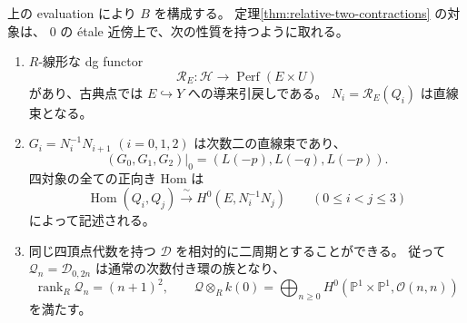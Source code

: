 \begin{proposition}\label{prop:relative-even-rollup}
上の evaluation により $B$ を構成する。
定理\ref{thm:relative-two-contractions} の対象は、
$0$ の \'etale 近傍上で、次の性質を持つように取れる。
\begin{enumerate}
\item
$R$-線形な dg functor
\[
 \mathcal R_E:\mathcal H\longrightarrow\operatorname{Perf}(E\times U)
\]
があり、古典点では $E\hookrightarrow Y$ への導来引戻しである。
$N_i=\mathcal R_E(Q_i)$ は直線束となる。
\item
$G_i=N_i^{-1}N_{i+1}$ $(i=0,1,2)$ は次数二の直線束であり、
\[
 (G_0,G_1,G_2)|_0=(L(-p),L(-q),L(-p)).
\]
四対象の全ての正向き Hom は
\[
 \operatorname{Hom}(Q_i,Q_j)
 \xrightarrow{\ \sim\ }H^0(E,N_i^{-1}N_j)
 \qquad(0\le i<j\le3)
 \label{eq:relative-restriction-hom}\tag{RB5}
\]
によって記述される。
\item
同じ四頂点代数を持つ $\mathcal D$ を相対的に二周期とすることができる。
従って $\mathcal Q_n=\mathcal D_{0,2n}$ は通常の次数付き環の族となり、
\[
 \operatorname{rank}_R\mathcal Q_n=(n+1)^2,\qquad
 \mathcal Q\otimes_R k(0)
 =\bigoplus_{n\ge0}H^0(\mathbb P^1\times\mathbb P^1,\mathcal O(n,n))
\]
を満たす。
\end{enumerate}
\end{proposition}

